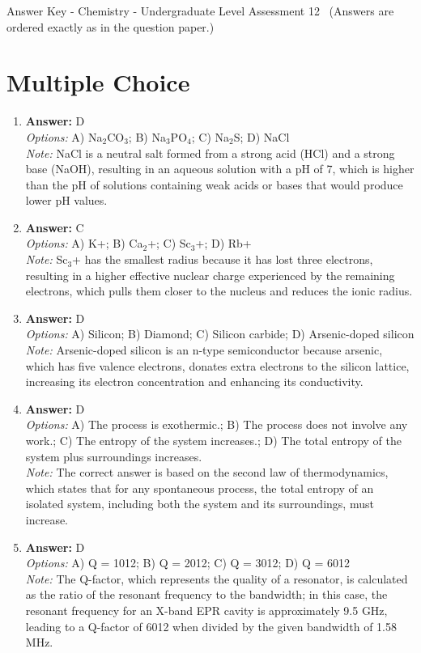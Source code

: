 \documentclass[12pt]{article}
\begin{document}
\begin{center}
Answer Key - Chemistry - Undergraduate Level Assessment 12 \
\small (Answers are ordered exactly as in the question paper.)
\end{center}

\section*{Multiple Choice}
\begin{enumerate}[label=\arabic*.]
\item \textbf{Answer:} D
\\ \textit{Options:} A) Na$_{2}$CO$_{3}$; B) Na$_{3}$PO$_{4}$; C) Na$_{2}$S; D) NaCl
\\ \textit{Note:} NaCl is a neutral salt formed from a strong acid (HCl) and a strong base (NaOH), resulting in an aqueous solution with a pH of 7, which is higher than the pH of solutions containing weak acids or bases that would produce lower pH values.
\item \textbf{Answer:} C
\\ \textit{Options:} A) K+; B) Ca$_{2}$+; C) Sc$_{3}$+; D) Rb+
\\ \textit{Note:} Sc$_{3}$+ has the smallest radius because it has lost three electrons, resulting in a higher effective nuclear charge experienced by the remaining electrons, which pulls them closer to the nucleus and reduces the ionic radius.
\item \textbf{Answer:} D
\\ \textit{Options:} A) Silicon; B) Diamond; C) Silicon carbide; D) Arsenic-doped silicon
\\ \textit{Note:} Arsenic-doped silicon is an n-type semiconductor because arsenic, which has five valence electrons, donates extra electrons to the silicon lattice, increasing its electron concentration and enhancing its conductivity.
\item \textbf{Answer:} D
\\ \textit{Options:} A) The process is exothermic.; B) The process does not involve any work.; C) The entropy of the system increases.; D) The total entropy of the system plus surroundings increases.
\\ \textit{Note:} The correct answer is based on the second law of thermodynamics, which states that for any spontaneous process, the total entropy of an isolated system, including both the system and its surroundings, must increase.
\item \textbf{Answer:} D
\\ \textit{Options:} A) Q = 1012; B) Q = 2012; C) Q = 3012; D) Q = 6012
\\ \textit{Note:} The Q-factor, which represents the quality of a resonator, is calculated as the ratio of the resonant frequency to the bandwidth; in this case, the resonant frequency for an X-band EPR cavity is approximately 9.5 GHz, leading to a Q-factor of 6012 when divided by the given bandwidth of 1.58 MHz.
\end{enumerate}
\end{document}

